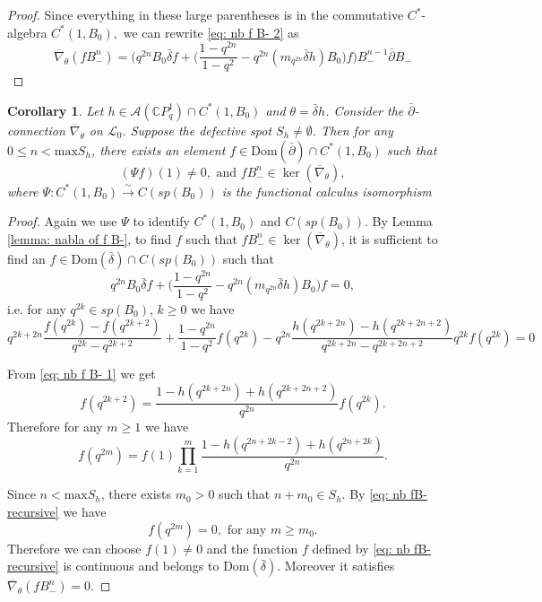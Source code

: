 \documentclass[12pt]{article}
\newtheorem{corollary}[definition]{Corollary}
\numberwithin{equation}{section}
\def\max{{\mathrm {max}}}
\def\Dom{{\mathrm {Dom}}}
\def\pb{\bar{\partial}}
\def\db{\bar{\delta}}
\def\nb{\bar{\nabla}_\theta}
\def\nb{\overline{\nabla}_\theta}
\def\C{{\mathbb C}}
\def\A{\mathcal{A}}
\def\L{\mathcal{L}}
\def\d{\bar{\delta}}
\begin{document}
\begin{proof}
    Since everything in these large parentheses is in the commutative $C^*$-algebra $C^*(1, B_0),$ we can rewrite \eqref{eq: nb f B- 2} as \[
    \nb(f B_-^n)=\Big( q^{2n} B_0 \d f + \big( \frac{1-q^{2n}}{1-q^2}  - q^{2n} (m_{q^{2n}} \d h) B_0\big) f \Big) B_-^{n-1} \pb B_- 
    \]  
\end{proof}

\begin{corollary}\label{coro: ker nb B-n}
   Let $h\in  \A(\C P^1_q)\cap C^*(1, B_0)$ and  $\theta = \d h$. Consider the $\pb$-connection $\nb$ on $\L_0$. Suppose the defective spot $S_h\neq \emptyset$. Then for any $0\leq n< \max{S_h}$, there exists an element $f\in \Dom(\pb)\cap   C^*(1, B_0)$ such that 
   $$
   (\Psi f)(1)\neq 0, \text{ and } f B_-^n\in \ker(\nb),
   $$
   where $\Psi: C^*(1, B_0)\overset{\sim}{\to}C(sp(B_0))$ is the functional calculus isomorphism
\end{corollary}
\begin{proof}
Again we use $\Psi$ to identify $C^*(1, B_0)$ and $ C(sp(B_0))$. By Lemma \ref{lemma: nabla of f B-}, to find $f$ such that $f B_-^n\in \ker(\nb)$, it is sufficient to find an $f\in \Dom(\db)\cap   C(sp(B_0))$ such that
\begin{equation}
  q^{2n} B_0 \d f + \big( \frac{1-q^{2n}}{1-q^2}  - q^{2n} (m_{q^{2n}} \d h) B_0\big) f=0,
\end{equation}
i.e. for any $q^{2k}\in sp(B_0)$, $k\geq 0$ we have 
\begin{equation}\label{eq: nb f B- 1}
     q^{2k+2n}  \frac{f(q^{2k}) - f(q^{2k+2})}{q^{2k} - q^{2k+2}} + \frac{1-q^{2n}}{1-q^2}f(q^{2k})  - q^{2n} \frac{h(q^{2k+2n}) - h(q^{2k+2n+2})}{q^{2k+2n} - q^{2k+2n+2}} q^{2k} f(q^{2k})  = 0
\end{equation}
   

    From \eqref{eq: nb f B- 1} we get
\begin{equation}
        f(q^{2k+2})=\frac{1-h(q^{2k+2n})+h(q^{2k+2n+2})}{q^{2n}}f(q^{2k}).
\end{equation}
Therefore for any $m\geq 1$ we have
\begin{equation}\label{eq: nb fB- recursive}
f(q^{2m})=  f(1) \prod_{k = 1}^{m} \frac{1 - h(q^{2n + 2k-2}) + h(q^{2n+2k })}{q^{2n}} .
\end{equation}

Since $n<\max{S_h}$, there exists $m_0> 0$ such that $n + m_0 \in S_h$. By \eqref{eq: nb fB- recursive} we have
$$
f(q^{2m})=0, \text{ for any }m \geq m_0.
$$
Therefore we can choose $f(1)\neq 0$ and the function $f$ defined by \eqref{eq: nb fB- recursive} is continuous and belongs to $\Dom(\db)$. Moreover it satisfies $\nb(fB_-^n)=0$.
\end{proof}
\end{document}
